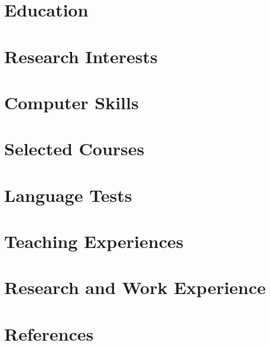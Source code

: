 \documentclass[10pt]{article}
\begin{document}
  \printVersionAndDate
  
  \vspace{-33pt}
  \begin{paracol}{2}
    \section{Education}
      
    \section{Research Interests}
      
    \section{Computer Skills}
      
    \section{Selected Courses}
      
    \section{Language Tests}
    
    \section{Teaching Experiences}
      
    \switchcolumn
%      
    \section{Research and Work Experience}
      
    \section{References}
      
  \end{paracol}
\end{document}
